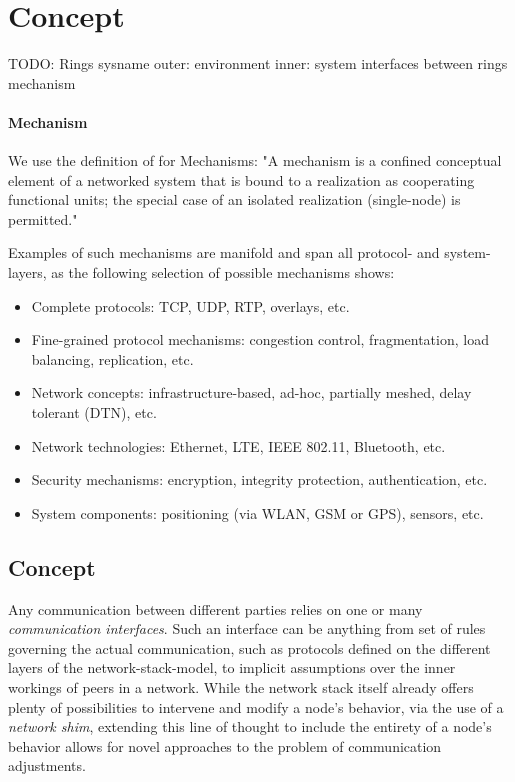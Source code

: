 \section{Concept}
\label{sec:design}






TODO:
Rings
sysname
outer: environment
inner: system
interfaces between rings
mechanism








\paragraph{Mechanism}

We use the definition of \cite{} for Mechanisms: "A mechanism is a confined conceptual element of a networked system that is bound to a realization as cooperating functional units; the special case of an isolated realization (single-node) is permitted."

Examples of such mechanisms are manifold and span all protocol- and system-layers, as the following selection of possible mechanisms shows:

\begin{itemize}
 \item Complete protocols: TCP, UDP, RTP, overlays, etc.
 \item Fine-grained protocol mechanisms: congestion control, fragmentation, load balancing, replication, etc.
 \item Network concepts: infrastructure-based, ad-hoc, partially meshed, delay tolerant (DTN), etc.
 \item Network technologies: Ethernet, LTE, IEEE 802.11, Bluetooth, etc.
 \item Security mechanisms: encryption, integrity protection, authentication, etc.
 \item System components: positioning (via WLAN, GSM or GPS), sensors, etc.
\end{itemize}

\subsection{Concept}
\label{sec:design:concept}

Any communication between different parties relies on one or many \textit{communication interfaces}.
Such an interface can be anything from set of rules governing the actual communication, such as protocols defined on the different layers of the network-stack-model, to implicit assumptions over the inner workings of peers in a network.
While the network stack itself already offers plenty of possibilities to intervene and modify a node's behavior, via the use of a \textit{network shim}, extending this line of thought to include the entirety of a node's behavior allows for novel approaches to the problem of communication adjustments.

